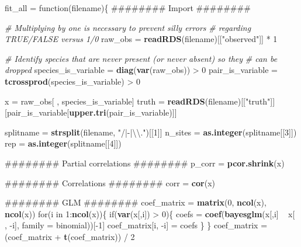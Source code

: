 \documentclass[11pt,]{article}
\newenvironment{Shaded}{\begin{snugshade}}{\end{snugshade}}
\newcommand{\KeywordTok}[1]{\textcolor[rgb]{0.13,0.29,0.53}{\textbf{{#1}}}}
\newcommand{\DataTypeTok}[1]{\textcolor[rgb]{0.13,0.29,0.53}{{#1}}}
\newcommand{\DecValTok}[1]{\textcolor[rgb]{0.00,0.00,0.81}{{#1}}}
\newcommand{\CharTok}[1]{\textcolor[rgb]{0.31,0.60,0.02}{{#1}}}
\newcommand{\StringTok}[1]{\textcolor[rgb]{0.31,0.60,0.02}{{#1}}}
\newcommand{\CommentTok}[1]{\textcolor[rgb]{0.56,0.35,0.01}{\textit{{#1}}}}
\newcommand{\NormalTok}[1]{{#1}}
\begin{document}
\begin{Shaded}
\begin{Highlighting}[]
\NormalTok{fit_all =}\StringTok{ }\NormalTok{function(filename)\{}
  \NormalTok{######## Import ########}
  
  \CommentTok{# Multiplying by one is necessary to prevent silly errors}
  \CommentTok{# regarding TRUE/FALSE versus 1/0}
  \NormalTok{raw_obs =}\StringTok{ }\KeywordTok{readRDS}\NormalTok{(filename)[[}\StringTok{"observed"}\NormalTok{]] *}\StringTok{ }\DecValTok{1}
  
  \CommentTok{# Identify species that are never present (or never absent) so they }
  \CommentTok{# can be dropped}
  \NormalTok{species_is_variable =}\StringTok{ }\KeywordTok{diag}\NormalTok{(}\KeywordTok{var}\NormalTok{(raw_obs)) >}\StringTok{ }\DecValTok{0}
  \NormalTok{pair_is_variable =}\StringTok{ }\KeywordTok{tcrossprod}\NormalTok{(species_is_variable) >}\StringTok{ }\DecValTok{0}
  
  \NormalTok{x =}\StringTok{ }\NormalTok{raw_obs[ , species_is_variable]}
  \NormalTok{truth =}\StringTok{ }\KeywordTok{readRDS}\NormalTok{(filename)[[}\StringTok{"truth"}\NormalTok{]][pair_is_variable[}\KeywordTok{upper.tri}\NormalTok{(pair_is_variable)]]}
  
  \NormalTok{splitname =}\StringTok{ }\KeywordTok{strsplit}\NormalTok{(filename, }\StringTok{"/|-|}\CharTok{\textbackslash{}\textbackslash{}}\StringTok{."}\NormalTok{)[[}\DecValTok{1}\NormalTok{]]}
  \NormalTok{n_sites =}\StringTok{ }\KeywordTok{as.integer}\NormalTok{(splitname[[}\DecValTok{3}\NormalTok{]])}
  \NormalTok{rep =}\StringTok{ }\KeywordTok{as.integer}\NormalTok{(splitname[[}\DecValTok{4}\NormalTok{]])}
  
  
  \NormalTok{######## Partial correlations ########}
  \NormalTok{p_corr =}\StringTok{ }\KeywordTok{pcor.shrink}\NormalTok{(x)}
  
  \NormalTok{######## Correlations ########}
  \NormalTok{corr =}\StringTok{ }\KeywordTok{cor}\NormalTok{(x)}
  
  \NormalTok{######## GLM ########}
  \NormalTok{coef_matrix =}\StringTok{ }\KeywordTok{matrix}\NormalTok{(}\DecValTok{0}\NormalTok{, }\KeywordTok{ncol}\NormalTok{(x), }\KeywordTok{ncol}\NormalTok{(x))}
  \NormalTok{for(i in }\DecValTok{1}\NormalTok{:}\KeywordTok{ncol}\NormalTok{(x))\{}
    \NormalTok{if(}\KeywordTok{var}\NormalTok{(x[,i]) >}\StringTok{ }\DecValTok{0}\NormalTok{)\{}
      \NormalTok{coefs =}\StringTok{ }\KeywordTok{coef}\NormalTok{(}\KeywordTok{bayesglm}\NormalTok{(x[,i] ~}\StringTok{ }\NormalTok{x[ , -i], }\DataTypeTok{family =} \NormalTok{binomial))[-}\DecValTok{1}\NormalTok{]}
      \NormalTok{coef_matrix[i, -i] =}\StringTok{ }\NormalTok{coefs}
    \NormalTok{\}}
  \NormalTok{\}}
  \NormalTok{coef_matrix =}\StringTok{ }\NormalTok{(coef_matrix +}\StringTok{ }\KeywordTok{t}\NormalTok{(coef_matrix)) /}\StringTok{ }\DecValTok{2}
  

\end{Highlighting}
\end{Shaded}
\end{document}
